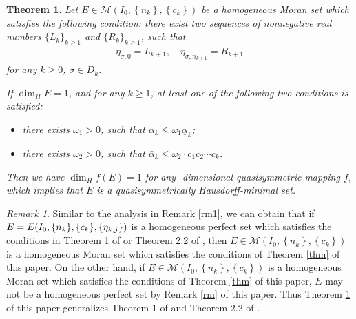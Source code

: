 \documentclass[reqno]{amsart}
\theoremstyle{plain}
\newtheorem{thm}{Theorem}
\theoremstyle{definition}
\theoremstyle{remark}
\newtheorem{rem}{Remark}
\numberwithin{equation}{section} \DeclareMathOperator\intr{int}
\begin{document}
\bigskip


\begin{thm}\label{thm2}
	    Let
	$E\in \mathcal{M}(I_{0},\left\{n_{k}\right\},\left\{c_{k}\right\})$ be a homogeneous Moran set which satisfies the following condition:
there exist two sequences of nonnegative real numbers $\{L_k\}_{k\ge1}$ and $\{R_k\}_{k\ge 1}$, such that
\begin{equation}
 \begin{aligned}
    \eta_{\sigma,0}=L_{k+1},\quad
    \eta_{\sigma,n_{k+1}}=R_{k+1} \nonumber
 \end{aligned}
 \end{equation}
 for any $k\ge 0$, $\sigma\in D_{k}$.

If $\dim_{H}E=1$, and for any $k\ge 1$, at least one of the following two conditions is satisfied:
\begin{itemize}
  \item[(A)]there exists $\omega_1>0$, such that $\bar\alpha_k\le \omega_1 \underline\alpha_k$;
  \item[(B)]there exists $\omega_2>0$, such that $\bar\alpha_k\le \omega_2\cdot c_1c_2\cdots c_k$.
\end{itemize}

Then we have $\operatorname{dim}_{H}f(E)=1$ for any -dimensional quasisymmetric mapping $f$, which implies that $E$ is a quasisymmetrically  Hausdorff-minimal set.

\end{thm}


\begin{rem}
Similar to the analysis in Remark \ref{rm1}, we can obtain that if $E=E(I_{0},\{n_{k}\}, \\\{c_{k}\},\{\eta_{k,j}\})$ is a homogeneous perfect set which satisfies the conditions in Theorem 1 of \cite{yjj18} or Theorem 2.2 of \cite{XYQ}, then $E\in \mathcal{M}(I_{0},\left\{n_{k}\right\},\left\{c_{k}\right\})$ is a homogeneous Moran set which satisfies the conditions of Theorem \ref{thm} of this paper. On the other hand, if $E\in \mathcal{M}(I_{0},\left\{n_{k}\right\},\left\{c_{k}\right\})$  is a homogeneous Moran set which satisfies the conditions of Theorem \ref{thm} of this paper, $E$ may not be a homogeneous perfect set by Remark \ref{rm} of this paper. Thus Theorem \ref{thm2} of this paper generalizes Theorem 1 of \cite{yjj18} and Theorem 2.2 of \cite{XYQ}.

\end{rem}
\bigskip
\end{document}
